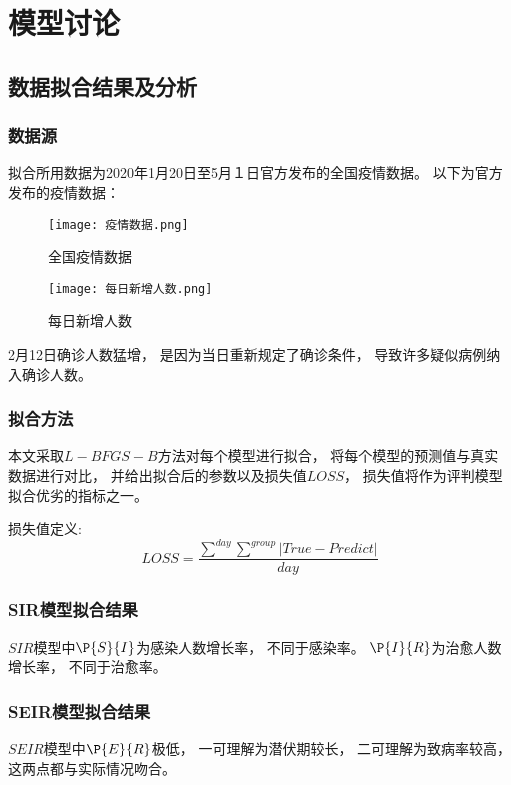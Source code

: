 \section{模型讨论}
\subsection{数据拟合结果及分析}
\subsubsection{数据源}
\par 拟合所用数据为2020年1月20日至5月１日官方发布的全国疫情数据。
以下为官方发布的疫情数据：
\begin{figure}
    \centering
    \texttt{[image: 疫情数据.png]}
    \caption{全国疫情数据}
\end{figure}
\begin{figure}
    \centering
    \texttt{[image: 每日新增人数.png]}
    \caption{每日新增人数}
\end{figure}
\par
2月12日确诊人数猛增，
是因为当日重新规定了确诊条件，
导致许多疑似病例纳入确诊人数。
\subsubsection{拟合方法}
\par 本文采取$L-BFGS-B$方法对每个模型进行拟合，
将每个模型的预测值与真实数据进行对比，
并给出拟合后的参数以及损失值$LOSS$，
损失值将作为评判模型拟合优劣的指标之一。
\par 损失值定义:
\begin{equation}
    LOSS = \frac{\sum\limits^{day}\sum\limits^{group}
        \left|True-Predict\right|}{day}
\end{equation}
\subsubsection{SIR模型拟合结果}
\par $SIR$模型中$\P{S}{I}$为感染人数增长率，
不同于感染率。
$\P{I}{R}$为治愈人数增长率，
不同于治愈率。
\subsubsection{SEIR模型拟合结果}
\par $SEIR$模型中$\P{E}{R}$极低，
一可理解为潜伏期较长，
二可理解为致病率较高，
这两点都与实际情况吻合。
